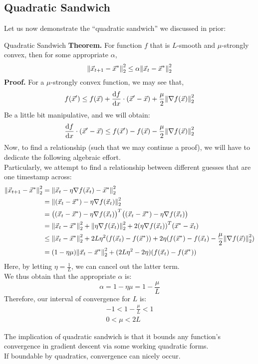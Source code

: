\subsection{Quadratic Sandwich}
Let us now demonstrate the ``quadratic sandwich'' we discussed in prior:
\begin{ln-theorem}{Quadratic Sandwich}{}
    \textbf{Theorem.} For function $f$ that is $L$-smooth and $\mu$-strongly convex, then for some appropriate $\alpha$,
    \[
        \pnorm[2]{\vec{x}_{t + 1} - \vec{x}^*}{2} \leq \alpha \pnorm[2]{\vec{x}_t - \vec{x}^*}{2}
    \]
    \tcblower
    \textbf{Proof.} For a $\mu$-strongly convex function, we may see that,
    \[
        f(\vec{x}') \leq f(\vec{x}) + \dv{f}{x} \cdot (\vec{x}' - \vec{x}) + \frac{\mu}{2} \pnorm[2]{\nabla f(\vec{x})}{2}
    \]
    Be a little bit manipulative, and we will obtain:
    \[
        \dv{f}{x} \cdot (\vec{x}' - \vec{x}) \leq f(\vec{x}') - f(\vec{x}) - \frac{\mu}{2} \pnorm[2]{\nabla f(\vec{x})}{2}
    \]
    Now, to find a relationship (such that we may continue a proof), we will have to dedicate the following algebraic effort.\\
    Particularly, we attempt to find a relationship between different guesses that are one timestamp across:
    \begin{align*}
        \pnorm[2]{\vec{x}_{t + 1} - \vec{x}^*}{2}
        &= \pnorm[2]{\vec{x}_t - \eta \nabla f(\vec{x}_t) - \vec{x}^*}{2} \\
        &= \pnorm[2]{(\vec{x}_t - \vec{x}^*) - \eta \nabla f(\vec{x}_t)}{2} \\
        &= {\big( (\vec{x}_t - \vec{x}^*) - \eta \nabla f(\vec{x}_t) \big)}^T \big( (\vec{x}_t - \vec{x}^*) - \eta \nabla f(\vec{x}_t) \big) \\
        &= \pnorm[2]{\vec{x}_t - \vec{x}^*}{2} + \pnorm[2]{\eta \nabla f(\vec{x}_t)}{2} + 2 {(\eta \nabla f(\vec{x}_t))}^T {(\vec{x}^* - \vec{x}_t)} \\
        &\leq \pnorm[2]{\vec{x}_t - \vec{x}^*}{2} + 2L \eta^2 (f(\vec{x}_t) - f(\vec{x}^*)) + 2 \eta (f(\vec{x}^*) - f(\vec{x}_t) - \frac{\mu}{2} \pnorm[2]{\nabla f(\vec{x})}{2}) \\
        &= (1 - \eta \mu) \pnorm[2]{\vec{x}_t - \vec{x}^*}{2} + (2L \eta^2 - 2\eta) (f(\vec{x}_t) - f(\vec{x}^*))
    \end{align*}
    Here, by letting $\eta = \frac{1}{L}$, we can cancel out the latter term. \\
    We thus obtain that the appropriate $\alpha$ is:
    \[
        \alpha = 1 - \eta \mu = 1 - \frac{\mu}{L}
    \]
    Therefore, our interval of convergence for $L$ is:
    \begin{align*}
        -1 < 1 - \frac{\mu}{L} < 1 \\
        0 < \mu < 2L
    \end{align*}
\end{ln-theorem}
The implication of quadratic sandwich is that it bounds any function's convergence in gradient descent via some working quadratic forms. \\
If boundable by quadratics, convergence can nicely occur.


